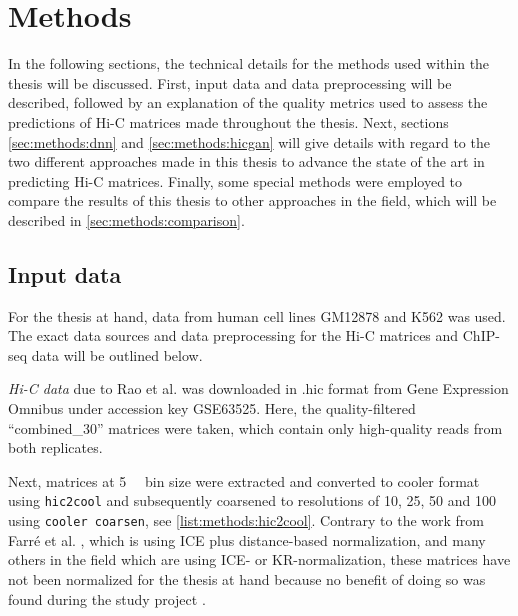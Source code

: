 \section{Methods}
In the following sections, the technical details for the methods used within the thesis will be discussed.
First, input data and data preprocessing will be described, followed by an explanation of the quality metrics used to assess the predictions
of Hi-C matrices made throughout the thesis.
Next, sections \ref{sec:methods:dnn} and \ref{sec:methods:hicgan} will give details with regard to the two 
different approaches made in this thesis to advance the state of the art in predicting Hi-C matrices.
Finally, some special methods were employed to compare the results of this thesis to 
other approaches in the field, which will be described in \cref{sec:methods:comparison}.

\subsection{Input data} \label{sec:methods:input_data}
For the thesis at hand, data from human cell lines GM12878 and K562 was used.
The exact data sources and data preprocessing for the Hi-C matrices and ChIP-seq data 
will be outlined below.

\emph{Hi-C data} due to Rao et al. \cite{Rao2014} was downloaded 
in .hic format from Gene Expression Omnibus under accession key GSE63525.
Here, the quality-filtered ``combined\_30'' matrices were taken, which contain only high-quality reads from 
both replicates.

Next, matrices at \SI{5}{\kilo\bp} bin size were extracted and converted to cooler format using \texttt{hic2cool}
and subsequently coarsened to resolutions of 10, 25, 50 and \SI{100}{\kilo\bp} using \texttt{cooler coarsen},
see \cref{list:methods:hic2cool}.
Contrary to the work from Farr\'e et al. \cite{Farre2018a}, which is using ICE plus distance-based normalization,
and many others in the field which are using ICE- or KR-normalization, 
these matrices have not been normalized for the thesis at hand
because no benefit of doing so was found during the study project \cite{Krauth2020}.

